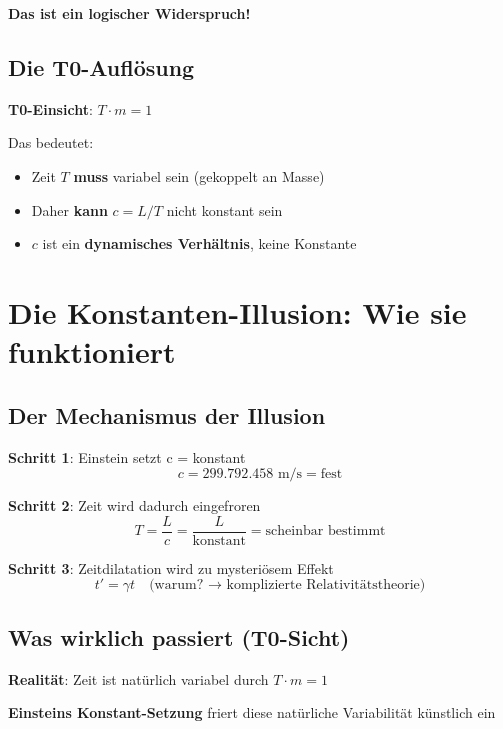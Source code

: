\documentclass[12pt,a4paper]{article}
\newcommand{\Tfield}{T}
\begin{document}
	\textbf{Das ist ein logischer Widerspruch!}
	
	\subsection{Die T0-Auflösung}
	
	\textbf{T0-Einsicht}: $\Tfield \cdot m = 1$
	
	Das bedeutet:
	\begin{itemize}
		\item Zeit $\Tfield$ \textbf{muss} variabel sein (gekoppelt an Masse)
		\item Daher \textbf{kann} $c = L/T$ nicht konstant sein
		\item $c$ ist ein \textbf{dynamisches Verhältnis}, keine Konstante
	\end{itemize}
	
	\section{Die Konstanten-Illusion: Wie sie funktioniert}
	
	\subsection{Der Mechanismus der Illusion}
	
	\textbf{Schritt 1}: Einstein setzt c = konstant
	\begin{equation}
		c = 299.792.458 \text{ m/s} = \text{fest}
	\end{equation}
	
	\textbf{Schritt 2}: Zeit wird dadurch eingefroren
	\begin{equation}
		T = \frac{L}{c} = \frac{L}{\text{konstant}} = \text{scheinbar bestimmt}
	\end{equation}
	
	\textbf{Schritt 3}: Zeitdilatation wird zu mysteriösem Effekt
	\begin{equation}
		t' = \gamma t \quad \text{(warum? → komplizierte Relativitätstheorie)}
	\end{equation}
	
	\subsection{Was wirklich passiert (T0-Sicht)}
	
	\textbf{Realität}: Zeit ist natürlich variabel durch $\Tfield \cdot m = 1$
	
	\textbf{Einsteins Konstant-Setzung} friert diese natürliche Variabilität künstlich ein
	
\end{document}
